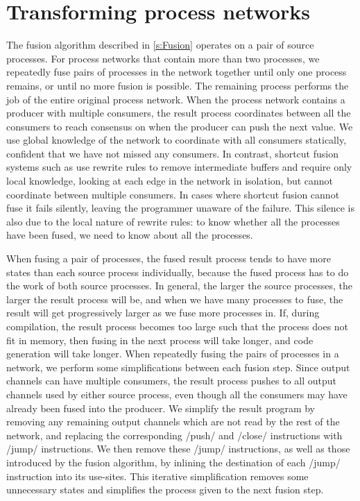\section{Transforming process networks}
\label{s:Optimisation}

The fusion algorithm described in \cref{s:Fusion} operates on a pair of source processes.
For process networks that contain more than two processes, we repeatedly fuse pairs of processes in the network together until only one process remains, or until no more fusion is possible.
The remaining process performs the job of the entire original process network.
When the process network contains a producer with multiple consumers, the result process coordinates between all the consumers to reach consensus on when the producer can push the next value.
We use global knowledge of the network to coordinate with all consumers statically, confident that we have not missed any consumers.
In contrast, shortcut fusion systems such as \cite{gill1993short} use rewrite rules to remove intermediate buffers and require only local knowledge, looking at each edge in the network in isolation, but cannot coordinate between multiple consumers.
In cases where shortcut fusion cannot fuse it fails silently, leaving the programmer unaware of the failure.
This silence is also due to the local nature of rewrite rules: to know whether all the processes have been fused, we need to know about all the processes.

When fusing a pair of processes, the fused result process tends to have more states than each source process individually, because the fused process has to do the work of both source processes.
In general, the larger the source processes, the larger the result process will be, and when we have many processes to fuse, the result will get progressively larger as we fuse more processes in.
If, during compilation, the result process becomes too large such that the process does not fit in memory, then fusing in the next process will take longer, and code generation will take longer.
When repeatedly fusing the pairs of processes in a network, we perform some simplifications between each fusion step.
Since output channels can have multiple consumers, the result process pushes to all output channels used by either source process, even though all the consumers may have already been fused into the producer.
We simplify the result program by removing any remaining output channels which are not read by the rest of the network, and replacing the corresponding \Hs/push/ and \Hs/close/ instructions with \Hs/jump/ instructions.
We then remove these \Hs/jump/ instructions, as well as those introduced by the fusion algorithm, by inlining the destination of each \Hs/jump/ instruction into its use-sites.
This iterative simplification removes some unnecessary states and simplifies the process given to the next fusion step.


